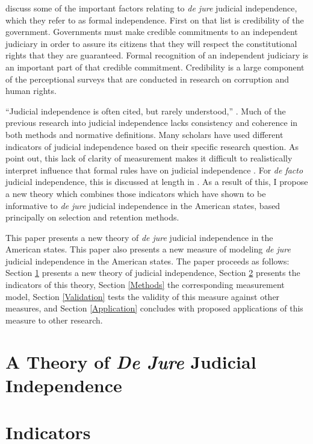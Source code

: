 \documentclass[12pt]{article}
\begin{document}
\citet{Hayo2007} discuss some of the important factors relating to \textit{de jure} judicial independence, which they refer to as formal independence.  First on that list is credibility of the government.  Governments must make credible commitments to an independent judiciary in order to assure its citizens that they will respect the constitutional rights that they are guaranteed.  Formal recognition of an independent judiciary is an important part of that credible commitment.   Credibility is a large component of the perceptional surveys that are conducted in research on corruption and human rights.

``Judicial independence is often cited, but rarely understood,'' \citep[1]{Tiede2006}.  Much of the previous research into judicial independence lacks consistency and coherence in both methods and normative definitions.  Many scholars have used different indicators of judicial independence based on their specific research question.  As \citeauthor{Rios2014} point out, this lack of clarity of measurement makes it difficult to realistically interpret influence that formal rules have on judicial independence \citep[2]{Rios2014}.  For \textit{de facto} judicial independence, this is discussed at length in \cite{Rios2014}.  As a result of this, I propose a new theory which combines those indicators which have shown to be informative to \textit{de jure} judicial independence in the American states, based principally on selection and retention methods.

This paper presents a new theory of \textit{de jure} judicial independence in the American states.  This paper also presents a new measure of modeling \textit{de jure} judicial independence in the American states.  The paper proceeds as follows: Section \ref{Theory} presents a new theory of judicial independence, Section \ref{Indicators} presents the indicators of this theory, Section \ref{Methods} the corresponding measurement model, Section \ref{Validation} tests the validity of this measure against other measures, and Section \ref{Application} concludes with proposed applications of this measure to other research.	

\section{A Theory of \textit{De Jure} Judicial Independence}\label{Theory}


\section{Indicators}\label{Indicators}

\end{document}
